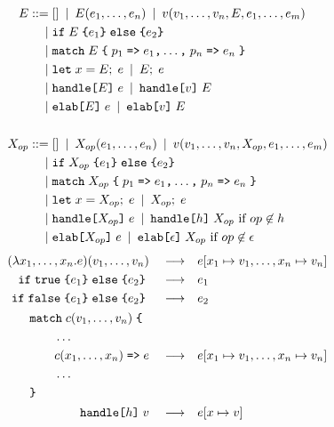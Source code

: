 \begin{figure}[p]
\begin{align*}
    E
        \IS & [] \OR E(e_1,\dots, e_n) \OR v(v_1,\dots,v_n,E,e_1,\dots,e_m) \\
        \OR & \cond{E}{e_1}{e_2} \\
        \OR & \kw{match}\;E\;\tok{\{}\;p_1\;\tok{=>}\;e_1\tok{,}\dots\tok{,}\;p_n\;\tok{=>}\;e_n\;\tok{\}} \\
        \OR & \kw{let}\;x = E;\;e \OR E;\;e\\
        \OR & \kw{handle}\tok{[}E\tok{]}\;e \OR \kw{handle}\tok{[}v\tok{]}\;E \\
        \OR & \kw{elab}\tok{[}E\tok{]}\;e \OR \kw{elab}\tok{[}v\tok{]}\;E\\
    \\
    X_{op}
        \IS & [] \OR X_{op}(e_1, \dots, e_n) \OR v(v_1, \dots, v_n, X_{op}, e_1, \dots, e_m) \\
        \OR & \cond{X_{op}}{e_1}{e_2} \\
        \OR & \kw{match}\;X_{op}\;\tok{\{}\;p_1\;\tok{=>}\;e_1\tok{,}\dots\tok{,}\;p_n\;\tok{=>}\;e_n\;\tok{\}} \\
        \OR & \kw{let}\;x = X_{op};\;e \OR X_{op};\;e \\
        \OR & \kw{handle}\tok{[}X_{op}\tok{]}\;e \OR \kw{handle}\tok{[}h\tok{]}\;{X_{op}} \text{ if } op\not\in h \\
        \OR & \elab\tok{[}X_{op}\tok{]}\;e \OR \kw{elab}\tok{[}\epsilon\tok{]}\;X_{op} \text{ if } op \not\in \epsilon
\end{align*}
\begin{align*}
    (\lambda x_1, \dots, x_n . e) (v_1, \dots, v_n) \reduce& e[x_1 \mapsto v_1, \dots, x_n \mapsto v_n] \\
    \cond{\true}{e_1}{e_2} \reduce& e_1 \\
    \cond{\false}{e_1}{e_2} \reduce& e_2 \\
    \begin{aligned}
    &\kw{match}\;c(v_1,\dots, v_n)\;\tok{\{}\\
    &\qquad\dots\\
    &\qquad c(x_1, \dots, x_n)\;\tok{=>}\;e\\
    &\qquad\dots\\
    &\tok{\}}
    \end{aligned}
    \reduce& e[x_1 \mapsto v_1, \dots, x_n \mapsto v_n]
    \\
    \kw{handle}\tok{[}h\tok{]}\;v \reduce& e[x\mapsto v] \\

\end{align*}
\end{figure}

